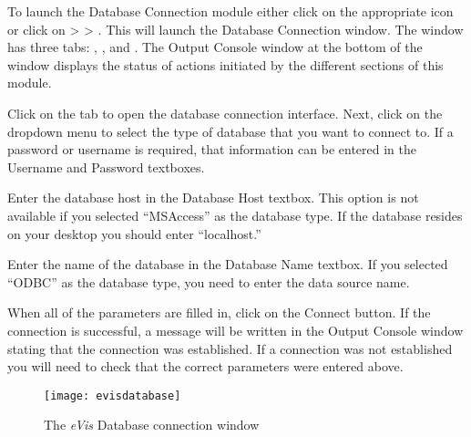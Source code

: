 \label{evis_launch_database}

To launch the Database Connection module either click on the appropriate icon
 or click on  >  >
. This will launch the Database Connection window. The window has
three tabs: , , and . The Output
Console window at the bottom of the window displays the status of actions initiated by the different
sections of this module.

\label{evis_connect_database}

Click on the  tab to open the database connection interface. Next, click on
the  dropdown menu to select the type of database that you want to
connect to. If a password or username is required, that information can be entered in the Username
and Password textboxes.

Enter the database host in the Database Host textbox. This option is not available if you selected
``MSAccess'' as the database type. If the database resides on your desktop you should enter
``localhost.''

Enter the name of the database in the Database Name textbox. If you selected ``ODBC'' as the
database type, you need to enter the data source name.

When all of the parameters are filled in, click on the Connect button. If the connection is
successful, a message will be written in the Output Console window stating that the connection was
established. If a connection was not established you will need to check that the correct parameters
were entered above.

\begin{figure}[ht]
   \centering
   \texttt{[image: evisdatabase]}
   \caption{\label{evisdatabase}The \emph{eVis} Database connection window \wincaption}
\end{figure}


